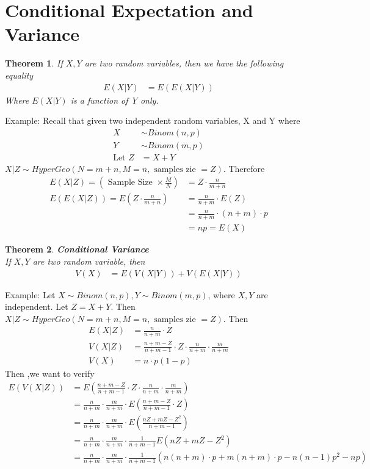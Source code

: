 \documentclass[11pt,oneside]{book}
\theoremstyle{break}
\theoremstyle{break}
\newtheorem{thm}{Theorem}[section]
\newcommand{\example}{\color{WildStrawberry}Example: \color{black}}
\begin{document}
\section[Conditional Expectation and Variance]{\color{DarkOrchid} Conditional Expectation and Variance}
\begin{thm}
If $X,Y$ are two random variables, then we have the following equality \begin{align*}
E(X|Y)&=E(E(X|Y))
\end{align*}
Where $E(X|Y)$ is a function of Y only.
\end{thm}
\example Recall that given two independent random variables, X and Y where\begin{align*}
X&\sim Binom(n,p)\\
Y&\sim Binom(m,p)\\
\text{Let }Z&=X+Y
\end{align*}
$X|Z\sim HyperGeo(N=m+n,M=n,\text{ samples zie }=Z)$. Therefore \begin{align*}
E(X|Z)=(\text{ Sample Size }\times \frac{M}{N})&=Z\cdot \frac{n}{m+n}\\
E(E(X|Z))=E\left(Z\cdot \frac{n}{m+n}\right)&=\frac{n}{n+m}\cdot E(Z)\\
&=\frac{n}{n+m}\cdot (n+m)\cdot p\\
&=np=E(X)
\end{align*}
\begin{thm}
\textbf{Conditional Variance}\\
If $X,Y$ are two random variable, then \begin{align*}
V(X)&=E(V(X|Y))+V(E(X|Y))
\end{align*}
\end{thm}
\example Let $X\sim Binom(n,p), Y\sim Binom(m,p)$, where $X,Y$ are independent. Let $Z=X+Y$. Then $X|Z\sim HyperGeo(N=m+n,M=n,\text{ samples zie }=Z)$. Then\\\begin{align*}
E(X|Z)&=\frac{n}{n+m}\cdot Z\\
V(X|Z)&=\frac{n+m-Z}{n+m-1}\cdot Z \cdot \frac{n}{n+m}\cdot \frac{m}{n+m}\\
V(X)&=n\cdot p(1-p)
\end{align*}
Then ,we want to verify \begin{align*}
E(V(X|Z))&=E\left(\frac{n+m-Z}{n+m-1}\cdot Z \cdot \frac{n}{n+m}\cdot \frac{m}{n+m}\right)\\
&=\frac{n}{n+m}\cdot \frac{m}{n+m}\cdot E\left(\frac{n+m-Z}{n+m-1}\cdot Z \right)\\
&=\frac{n}{n+m}\cdot \frac{m}{n+m}\cdot E\left(\frac{nZ+mZ-Z^2}{n+m-1} \right)\\
&=\frac{n}{n+m}\cdot \frac{m}{n+m}\cdot \frac{1}{n+m-1} E\left(nZ+mZ-Z^2 \right)\\
&=\frac{n}{n+m}\cdot \frac{m}{n+m}\cdot \frac{1}{n+m-1} (n(n+m)\cdot p+m(n+m)\cdot p -n(n-1)p^2-np)\\
\end{align*}
\end{document}
